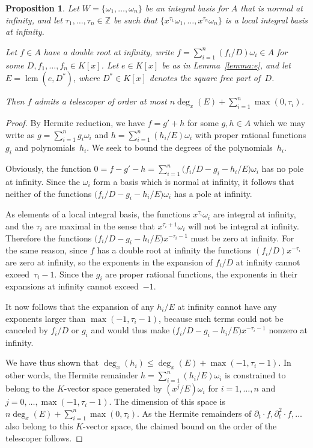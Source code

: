 \documentclass[final,1p,times,authoryear]{elsarticle}
\newtheorem{prop}[theorem]{Proposition}
\def\lcm{\operatorname{lcm}}
\let\set\mathbb
\begin{document}
\begin{prop}\label{PROP:order}
  Let $W=\{\omega_1,\dots,\omega_n\}$ be an integral basis for $A$ that is normal at infinity,
  and let $\tau_1,\dots,\tau_n\in\set Z$ be such that $\{x^{\tau_1}\omega_1,\dots,x^{\tau_n}\omega_n\}$
  is a local integral basis at infinity.

  Let $f\in A$ have a double root at infinity,
  write $f=\sum_{i=1}^n(f_i/D)\omega_i\in A$ for some $D,f_1,\dots,f_n\in K[x]$.
  Let $e\in K[x]$ be as in Lemma~\ref{lemma:e},
  and let $E=\lcm(e,D^\ast)$, where $D^\ast\in K[x]$ denotes the square free part of~$D$.

  Then $f$ admits a telescoper of order at most $n\deg_x(E)+\sum_{i=1}^n\max(0,\tau_i)$.
\end{prop}
\begin{proof}
  By Hermite reduction, we have $f=g'+h$ for some $g,h\in A$ which we may write
  as $g=\sum_{i=1}^n g_i\omega_i$ and $h=\sum_{i=1}^n (h_i/E)\omega_i$ with
  proper rational functions $g_i$ and polynomials~$h_i$. We seek to bound the
  degrees of the polynomials~$h_i$.

  Obviously, the function $0=f-g'-h=\sum_{i=1}^n\bigl(f_i/D-g_i-h_i/E\bigr)\omega_i$ has no
  pole at infinity. Since the $\omega_i$ form a basis which is normal at infinity, it
  follows that neither of the functions $\bigl(f_i/D-g_i-h_i/E\bigr)\omega_i$ has a pole
  at infinity.

  As elements of a local integral basis, the functions $x^{\tau_i}\omega_i$ are integral
  at infinity, and the $\tau_i$ are maximal in the sense that $x^{\tau_i+1}\omega_i$ will
  not be integral at infinity. Therefore the functions
  $\bigl(f_i/D-g_i-h_i/E\bigr)x^{-\tau_i-1}$ must be zero at infinity.
  For the same reason, since $f$ has a double root at infinity
  the functions $(f_i/D)x^{-\tau_i}$ are zero at infinity,
  so the exponents in the expansion of $f_i/D$ at infinity cannot exceed~$\tau_i-1$.
  Since the $g_i$ are proper rational functions, the exponents in their expansions at
  infinity cannot exceed~$-1$.

  It now follows that the expansion of any $h_i/E$ at infinity cannot have any exponents
  larger than $\max(-1,\tau_i-1)$, because such terms could not be canceled by
  $f_i/D$ or $g_i$ and would thus make $\bigl(f_i/D-g_i-h_i/E\bigr)x^{-\tau_i-1}$ nonzero
  at infinity.

  We have thus shown that $\deg_x(h_i)\leq\deg_x(E)+\max(-1,\tau_i-1)$.
  In other words, the Hermite remainder $h=\sum_{i=1}^n (h_i/E)\omega_i$ is constrained
  to belong to the $K$-vector space generated by $(x^j/E)\omega_i$ for $i=1,\dots,n$
  and $j=0,\dots,\max(-1,\tau_i-1)$.
  The dimension of this space is $n\deg_x(E)+\sum_{i=1}^n\max(0,\tau_i)$.
  As the Hermite remainders of $\partial_t\cdot f,\partial_t^2\cdot f,\dots$ also belong
  to this $K$-vector space, the claimed bound on the order of the telescoper follows.
\end{proof}
\end{document}
